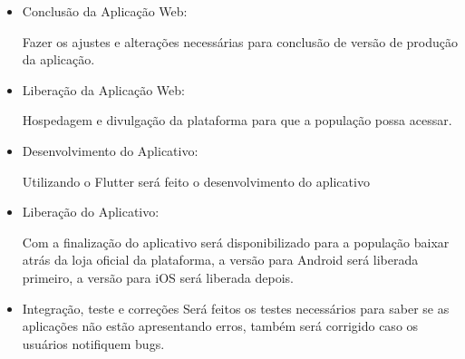 \documentclass{ifto-tex}
\begin{document}

\begin{itemize}[label={$\bullet$}]
	\item Conclusão da Aplicação Web:
	
	Fazer os ajustes e alterações necessárias para conclusão de versão de produção da aplicação.
	
	\item Liberação da Aplicação Web:
	
	Hospedagem e divulgação da plataforma para que a população possa acessar.
	
	\item Desenvolvimento do Aplicativo:
	
	Utilizando o Flutter será feito o desenvolvimento do aplicativo
	
	\item Liberação do Aplicativo:
	
	Com a finalização do aplicativo será disponibilizado para a população baixar atrás da loja oficial da plataforma, a versão para Android será liberada primeiro, a versão para iOS será liberada depois.
	
	\item Integração, teste e correções
	Será feitos os testes necessários para saber se as aplicações não estão apresentando erros, também será corrigido caso os usuários notifiquem bugs.
	
	
\end{itemize}

\postextual


\end{document}
